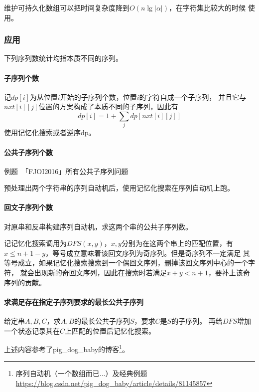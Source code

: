 维护可持久化数组可以把时间复杂度降到$O(n\lg |\alpha|)$，在字符集比较大的时候
使用。
\subsubsection{应用}
下列序列数统计均指本质不同的序列。
\paragraph{子序列个数}
记$dp[i]$为从位置$i$开始的子序列个数，位置$i$的字符自成一个子序列，
并且它与$nxt[i][j]$位置的方案构成了本质不同的子序列，因此有
\begin{displaymath}
    dp[i]=1+\sum_j{dp[nxt[i][j]]}
\end{displaymath}
使用记忆化搜索或者逆序dp。
\paragraph{公共子序列个数}
例题~「FJOI2016」所有公共子序列问题

预处理出两个字符串的序列自动机后，使用记忆化搜索在序列自动机上跑。
\paragraph{回文子序列个数}
对原串和反串构建序列自动机，求这两个串的公共子序列数。

记记忆化搜索调用为$DFS(x,y)$，$x,y$分别为在这两个串上的匹配位置，有
$x\leq n+1-y$，等号成立意味着该回文序列为奇序列。但是奇序列不一定满足
其等号成立，如果记忆化搜索搜索到一个偶回文序列，删掉该回文序列中心的一个字符，
就会出现新的奇回文序列，因此在搜索时若满足$x+y<n+1$，要补上该奇序列的贡献。
\paragraph{求满足存在指定子序列要求的最长公共子序列}
给定串$A,B,C$，求$A,B$的最长公共子序列$S$，要求$C$是$S$的子序列。
再给$DFS$增加一个状态记录其在$C$上匹配的位置后记忆化搜索。

上述内容参考了pig\_dog\_baby的博客\footnote{
    序列自动机（一个数组而已...）及经典例题
    \url{https://blog.csdn.net/pig\_dog\_baby/article/details/81145857}
}。
